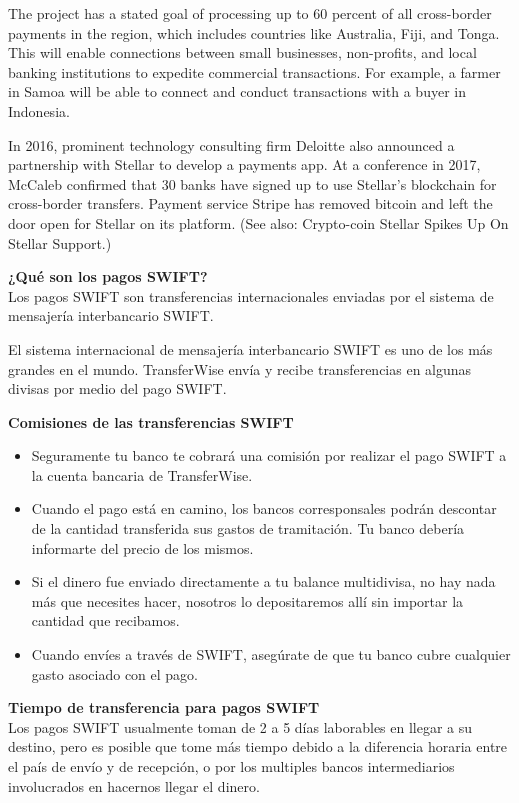 \documentclass[a4paper,12pt]{/home/armando/Documentos/Cursos/LaTeX/Plantillas/lib/pub}
\begin{document}
	The project has a stated goal of processing up to 60 percent of all cross-border payments in the region, which includes countries like Australia, Fiji, and Tonga. This will enable connections between small businesses, non-profits, and local banking institutions to expedite commercial transactions. For example, a farmer in Samoa will be able to connect and conduct transactions with a buyer in Indonesia.
	
	In 2016, prominent technology consulting firm Deloitte also announced a partnership with Stellar to develop a payments app. At a conference in 2017, McCaleb confirmed that 30 banks have signed up to use Stellar’s blockchain for cross-border transfers. Payment service Stripe has removed bitcoin and left the door open for Stellar on its platform. (See also: Crypto-coin Stellar Spikes Up On Stellar Support.) 
	
	\textbf{¿Qué son los pagos SWIFT?}\\
	
	Los pagos SWIFT son transferencias internacionales enviadas por el sistema de mensajería interbancario SWIFT.
	
	El sistema internacional de mensajería interbancario SWIFT es uno de los más grandes en el mundo. TransferWise envía y recibe transferencias en algunas divisas por medio del pago SWIFT.
	
	\textbf{Comisiones de las transferencias SWIFT}\\
	\begin{itemize}
		\item Seguramente tu banco te cobrará una comisión por realizar el pago SWIFT a la cuenta bancaria de TransferWise. 
		
		\item Cuando el pago está en camino, los bancos corresponsales podrán descontar de la cantidad transferida sus gastos de tramitación. Tu banco debería informarte del precio de los mismos.
		
		\item Si el dinero fue enviado directamente a tu balance multidivisa, no hay nada más que necesites hacer, nosotros lo depositaremos allí sin importar la cantidad que recibamos.
		
		\item Cuando envíes a través de SWIFT, asegúrate de que tu banco cubre cualquier gasto asociado con el pago. 
	\end{itemize}

		\textbf{Tiempo de transferencia para pagos SWIFT}\\
		Los pagos SWIFT usualmente toman de 2 a 5 días laborables en llegar a su destino, pero es posible que tome más tiempo debido a la diferencia horaria entre el país de envío y de recepción, o por los multiples bancos intermediarios involucrados en hacernos llegar el dinero.
	
\end{document}
